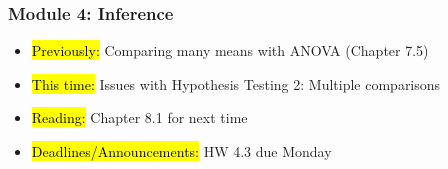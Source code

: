 
\begin{frame}
    \frametitle{Module 4: Inference}
    \begin{itemize}
        \item \hl{Previously: }Comparing many means with ANOVA (Chapter 7.5)
        \item \hl{This time: }Issues with Hypothesis Testing 2: Multiple comparisons
        \item \hl{Reading: }Chapter 8.1 for next time
        \item \hl{Deadlines/Announcements: }HW 4.3 due Monday
    \end{itemize}
    
\end{frame}